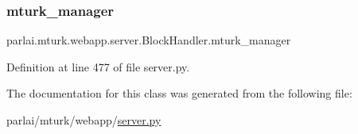 \subsubsection{\texorpdfstring{mturk\+\_\+manager}{mturk\_manager}}
{\footnotesize\ttfamily parlai.\+mturk.\+webapp.\+server.\+Block\+Handler.\+mturk\+\_\+manager}



Definition at line 477 of file server.\+py.



The documentation for this class was generated from the following file\+:\begin{DoxyCompactItemize}
\item 
parlai/mturk/webapp/\hyperlink{server_8py}{server.\+py}\end{DoxyCompactItemize}
